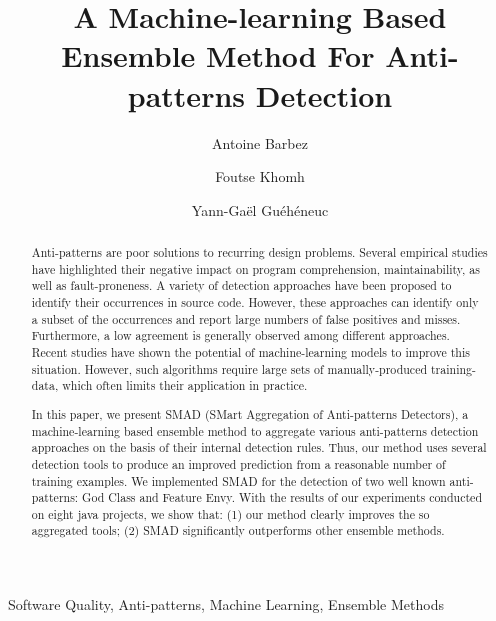 \begin{frontmatter}
\title{A Machine-learning Based Ensemble Method For Anti-patterns Detection}

\author[poly]{Antoine Barbez}

\author[poly]{Foutse Khomh}

\author[concordia]{Yann-Gaël Guéhéneuc}

\address[poly]{Polytechnique Montreal}
\address[concordia]{Concordia University}

\begin{abstract}
Anti-patterns are poor solutions to recurring design problems. Several empirical studies have highlighted their negative impact on program comprehension, maintainability, as well as fault-proneness. A variety of detection approaches have been proposed to identify their occurrences in source code. However, these approaches can identify only a subset of the occurrences and report large numbers of false positives and misses. Furthermore, a low agreement is generally observed among different approaches. Recent studies have shown the potential of machine-learning models to improve this situation. However, such algorithms require large sets of manually-produced training-data, which often limits their application in practice. 

In this paper, we present SMAD (SMart Aggregation of Anti-patterns Detectors), a machine-learning based ensemble method to aggregate various anti-patterns detection approaches on the basis of their internal detection rules. Thus, our method uses several detection tools to produce an improved prediction from a reasonable number of training examples. We implemented SMAD for the detection of two well known anti-patterns: God Class and Feature Envy. With the results of our experiments conducted on eight java projects, we show that: (1) our method clearly improves the so aggregated tools; (2) SMAD significantly outperforms other ensemble methods.
\end{abstract}

\begin{keyword}
Software Quality, Anti-patterns, Machine Learning, Ensemble Methods
\end{keyword}

\end{frontmatter}









